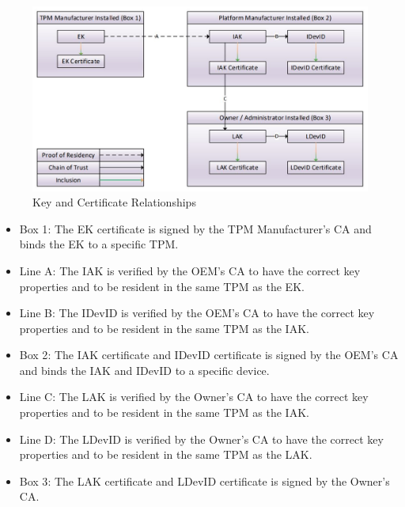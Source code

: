  
\begin{figure}[h]
  \begin{centering}
  \includegraphics[width=\linewidth]{chap_3_figures/certificateRelationships.jpg}
  \par\end{centering}
  \caption{Key and Certificate Relationships \cite{DevIDSpec-TCG}}
  \label{fig:cert_rel}
\end{figure}
\begin{itemize}[itemsep=0pt,parsep=0pt,partopsep=0pt]
  \item \textsf{Box 1}: The EK certificate is signed by the TPM Manufacturer's CA and binds the EK to a specific TPM.
  \item \textsf{Line A}: The IAK is verified by the OEM's CA to have the correct key properties and to be resident in the same TPM as the EK.
  \item \textsf{Line B}: The IDevID is verified by the OEM's CA to have the correct key properties and to be resident in the same TPM as the IAK.
  \item \textsf{Box 2}: The IAK certificate and IDevID certificate is signed by the OEM's CA and binds the IAK and IDevID to a specific device.
  \item \textsf{Line C}: The LAK is verified by the Owner's CA to have the correct key properties and to be resident in the same TPM as the IAK.
  \item \textsf{Line D}: The LDevID is verified by the Owner's CA to have the correct key properties and to be resident in the same TPM as the LAK.
  \item \textsf{Box 3}: The LAK certificate and LDevID certificate is signed by the Owner's CA.
\end{itemize}

